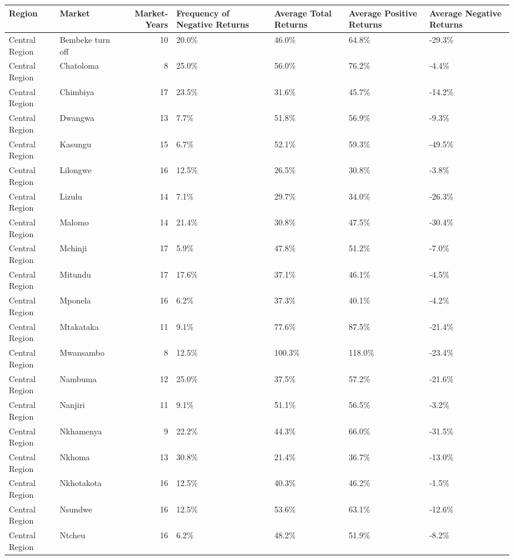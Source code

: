 \begin{table}[ht]
\centering
\begin{tabular}{llrllll}
  \hline
Region & Market & Market-Years & Frequency of Negative Returns & Average Total Returns & Average Positive Returns & Average Negative Returns \\ 
  \hline
Central Region & Bembeke turn off &  10 & 20.0\% & 46.0\% & 64.8\% & -29.3\% \\ 
  Central Region & Chatoloma &   8 & 25.0\% & 56.0\% & 76.2\% & -4.4\% \\ 
  Central Region & Chimbiya &  17 & 23.5\% & 31.6\% & 45.7\% & -14.2\% \\ 
  Central Region & Dwangwa &  13 & 7.7\% & 51.8\% & 56.9\% & -9.3\% \\ 
  Central Region & Kasungu &  15 & 6.7\% & 52.1\% & 59.3\% & -49.5\% \\ 
  Central Region & Lilongwe &  16 & 12.5\% & 26.5\% & 30.8\% & -3.8\% \\ 
  Central Region & Lizulu &  14 & 7.1\% & 29.7\% & 34.0\% & -26.3\% \\ 
  Central Region & Malomo &  14 & 21.4\% & 30.8\% & 47.5\% & -30.4\% \\ 
  Central Region & Mchinji &  17 & 5.9\% & 47.8\% & 51.2\% & -7.0\% \\ 
  Central Region & Mitundu &  17 & 17.6\% & 37.1\% & 46.1\% & -4.5\% \\ 
  Central Region & Mponela &  16 & 6.2\% & 37.3\% & 40.1\% & -4.2\% \\ 
  Central Region & Mtakataka &  11 & 9.1\% & 77.6\% & 87.5\% & -21.4\% \\ 
  Central Region & Mwansambo &   8 & 12.5\% & 100.3\% & 118.0\% & -23.4\% \\ 
  Central Region & Nambuma &  12 & 25.0\% & 37.5\% & 57.2\% & -21.6\% \\ 
  Central Region & Nanjiri &  11 & 9.1\% & 51.1\% & 56.5\% & -3.2\% \\ 
  Central Region & Nkhamenya &   9 & 22.2\% & 44.3\% & 66.0\% & -31.5\% \\ 
  Central Region & Nkhoma &  13 & 30.8\% & 21.4\% & 36.7\% & -13.0\% \\ 
  Central Region & Nkhotakota &  16 & 12.5\% & 40.3\% & 46.2\% & -1.5\% \\ 
  Central Region & Nsundwe &  16 & 12.5\% & 53.6\% & 63.1\% & -12.6\% \\ 
  Central Region & Ntcheu &  16 & 6.2\% & 48.2\% & 51.9\% & -8.2\% \\ 

\end{tabular}
\end{table}
